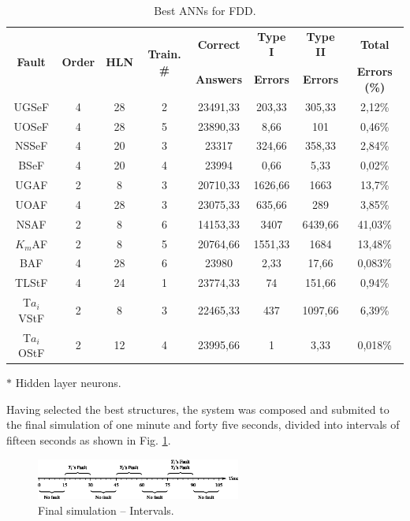 \documentclass[10pt,fleqn,a4paper]{article}
\begin{document}
\begin{table}[htb]
\centering
\caption{Best ANNs for FDD.}
\label{tab:best_ann}
\begin{threeparttable}
\begin{tabular}{|c|c|c|c|c|c|c|c|}
\hline
\multirow{2}{*}{\bf Fault} &
\multirow{2}{*}{\bf Order} &
\multirow{2}{*}{{\bf HLN}\tnote{$*$}} &
\multirow{2}{*}{\bf Train. \#} &
{\bf Correct} & {\bf Type I} & {\bf Type II} & {\bf Total}\\
& & & & {\bf Answers} & {\bf Errors} & {\bf Errors} & {\bf Errors (\%)}\\
\hline
UGSeF & 4 & 28 & 2 & 23491,33 & 203,33 & 305,33 & 2,12\%\\
\hline
UOSeF & 4 & 28 & 5 & 23890,33 & 8,66 & 101 & 0,46\%\\
\hline
NSSeF & 4 & 20 & 3 & 23317 & 324,66 & 358,33 & 2,84\%\\
\hline
BSeF & 4 & 20 & 4 & 23994 & 0,66 & 5,33 & 0,02\%\\
\hline
UGAF & 2 & 8 & 3 & 20710,33 & 1626,66 & 1663 & 13,7\%\\
\hline
UOAF & 4 & 28 & 3 & 23075,33 & 635,66 & 289 & 3,85\%\\
\hline
{NSAF} & 2 & 8 & 6 & 14153,33 & 3407 & 6439,66 & 41,03\%\\
\hline
$K_m$AF & 2 & 8 & 5 & 20764,66 & 1551,33 & 1684 & 13,48\%\\
\hline
BAF & 4 & 28 & 6 & 23980 & 2,33 & 17,66 & 0,083\%\\
\hline
TLStF & 4 & 24 & 1 & 23774,33 & 74 & 151,66 & 0,94\%\\
\hline
T$a_i$VStF & 2 & 8 & 3 & 22465,33 & 437 & 1097,66 & 6,39\%\\
\hline
T$a_i$OStF & 2 & 12 & 4 & 23995,66 & 1 & 3,33 & 0,018\%\\
\hline
\end{tabular}
\begin{tablenotes}
\item [$*$] Hidden layer neurons.
\end{tablenotes}
\end{threeparttable}
\end{table}

Having selected the best structures, the system was composed and submited to the
final simulation of one minute and forty five seconds, divided into intervals of
fifteen seconds as shown in Fig. \ref{fig:intervals}.

\begin{figure}[htb]
\centering
    \includegraphics[width=0.6\textwidth]{imgs/intervals}
    \caption{Final simulation -- Intervals.}
    \label{fig:intervals}
\end{figure}
\end{document}

